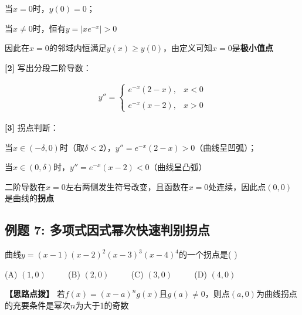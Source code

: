 \documentclass[11pt,a4paper,UTF8]{ctexart}
\begin{document}
\begin{solbox}[分步推导与答题规范]
当$x = 0$时，$y(0) = 0$；

当$x \neq 0$时，恒有$y = \vert{}xe^{-x}\vert{} > 0$

因此在$x = 0$的邻域内恒满足$y(x) \ge y(0)$，由定义可知$x = 0$是\textbf{极小值点}

\end{solbox}

\textbf{[2]} 写出分段二阶导数：

\begin{solbox}[分步推导与答题规范]

\begin{align*}
y'' = \begin{cases} e^{-x}(2 - x), & x < 0 \\ \\ e^{-x}(x - 2), & x > 0 \end{cases}
\end{align*}


\end{solbox}

\textbf{[3]} 拐点判断：

\begin{solbox}[分步推导与答题规范]
当$x \in (-\delta, 0)$时（取$\delta < 2$），$y'' = e^{-x}(2 - x) > 0$（曲线呈凹弧）；

当$x \in (0, \delta)$时，$y'' = e^{-x}(x - 2) < 0$（曲线呈凸弧）

二阶导数在$x = 0$左右两侧发生符号改变，且函数在$x = 0$处连续，因此点$(0, 0)$是曲线的\textbf{拐点}

\end{solbox}


\subsection{例题 7: 多项式因式幂次快速判别拐点}

曲线$y = (x-1)(x-2)^2(x-3)^3(x-4)^4$的一个拐点是( )

(A) $(1, 0)$ $\qquad$ (B) $(2, 0)$ $\qquad$ (C) $(3, 0)$ $\qquad$ (D) $(4, 0)$

\textbf{\color{DeepPurple}【思路点拨】} 若$f(x) = (x - a)^n g(x)$且$g(a) \neq 0$，则点$(a, 0)$为曲线拐点的充要条件是幂次$n$为大于1的奇数
\end{document}
